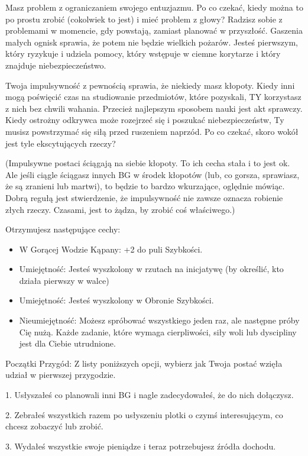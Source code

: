 Masz problem z ograniczaniem swojego entuzjazmu. Po co czekać, kiedy można to po prostu zrobić (cokolwiek to jest) i mieć problem z głowy? Radzisz sobie z problemami w momencie, gdy powstają, zamiast planować w przyszłość. Gaszenia małych ognisk sprawia, że potem nie będzie wielkich pożarów. Jesteś pierwszym, który ryzykuje i udziela pomocy, który wstępuje w ciemne korytarze i który znajduje niebezpieczeństwo.

Twoja impulsywność z pewnością sprawia, że niekiedy masz kłopoty. Kiedy inni mogą poświęcić czas na studiowanie przedmiotów, które pozyskali, TY korzystasz z nich bez chwili wahania. Przecież najlepszym sposobem nauki jest akt sprawczy. Kiedy ostrożny odkrywca może rozejrzeć się i poszukać niebezpieczeństw, Ty musisz powstrzymać się siłą przed ruszeniem naprzód. Po co czekać, skoro wokół jest tyle ekscytujących rzeczy?

(Impulsywne postaci ściągają na siebie kłopoty. To ich cecha stała i to jest ok. Ale jeśli ciągle ściągasz innych BG w środek kłopotów (lub, co gorsza, sprawiasz, że są zranieni lub martwi), to będzie to bardzo wkurzające, oględnie mówiąc. Dobrą regułą jest stwierdzenie, że impulsywność nie zawsze oznacza robienie złych rzeczy. Czasami, jest to żądza, by zrobić coś właściwego.)

Otrzymujesz następujące cechy:
\begin{itemize}
\item W Gorącej Wodzie Kąpany: +2 do puli Szybkości.
\item  Umiejętność: Jesteś wyszkolony w rzutach na inicjatywę (by określić, kto działa pierwszy w walce)
\item Umiejętność: Jesteś wyszkolony w Obronie Szybkości.
\item Nieumiejętność: Możesz spróbować wszystkiego jeden raz, ale następne próby Cię nużą. Każde zadanie, które wymaga cierpliwości, siły woli lub dyscipliny jest dla Ciebie utrudnione. 
\end{itemize}

Początki Przygód: Z listy poniższych opcji, wybierz jak Twoja postać wzięła udział w pierwszej przygodzie.

1. Usłyszałeś co planowali inni BG i nagle zadecydowałeś, że do nich dołączysz.

2. Zebrałeś wszystkich razem po usłyszeniu plotki o czymś interesującym, co chcesz zobaczyć lub zrobić.

3. Wydałeś wszystkie swoje pieniądze i teraz potrzebujesz źródła dochodu.


